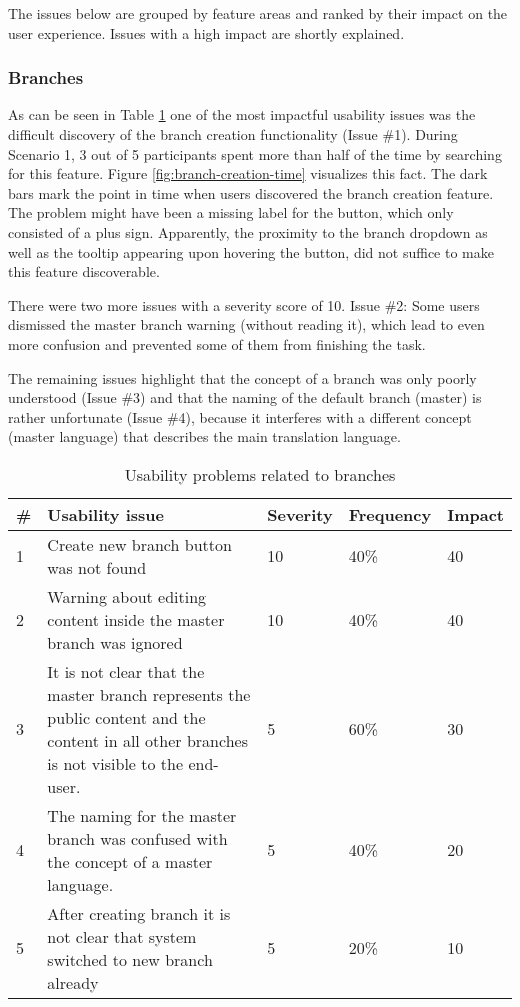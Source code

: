 The issues below are grouped by feature areas and ranked by their impact on the user experience. Issues with a high impact are shortly explained.


\subsubsection{Branches}
As can be seen in Table \ref{table:issues-branches} one of the most impactful usability issues was the difficult discovery of the branch creation functionality (Issue \#1). During Scenario 1, 3 out of 5 participants spent more than half of the time by searching for this feature. Figure \ref{fig:branch-creation-time} visualizes this fact. The dark bars mark the point in time when users discovered the branch creation feature. The problem might have been a missing label for the button, which only consisted of a plus sign. Apparently, the proximity to the branch dropdown as well as the tooltip appearing upon hovering the button, did not suffice to make this feature discoverable.

There were two more issues with a severity score of 10. Issue \#2: Some users dismissed the master branch warning (without reading it), which lead to even more confusion and prevented some of them from finishing the task.

The remaining issues highlight that the concept of a branch was only poorly understood (Issue \#3) and that the naming of the default branch (master) is rather unfortunate (Issue \#4), because it interferes with a different concept (master language) that describes the main translation language.

\begin{table}[h!]
\centering
\begin{tabular}{|l|p{7cm}|l|l|l|}
\hline
\rowcolor[HTML]{EFEFEF}
\textbf{\#} & \textbf{Usability issue} & \textbf{Severity} & \textbf{Frequency} & \textbf{Impact} \\ \hline
1 & Create new branch button was not found & 10 & 40\% & 40 \\ \hline
2 & Warning about editing content inside the master branch was ignored & 10 & 40\% & 40 \\ \hline
3 & It is not clear that the master branch represents the public content and the content in all other branches is not visible to the end-user. & 5 & 60\% & 30 \\ \hline
4 & The naming for the master branch was confused with the concept of a master language. & 5 & 40\% & 20 \\ \hline
5 & After creating branch it is not clear that system switched to new branch already & 5 & 20\% & 10 \\ \hline
\end{tabular}
\caption{Usability problems related to branches}
\label{table:issues-branches}
\end{table}

